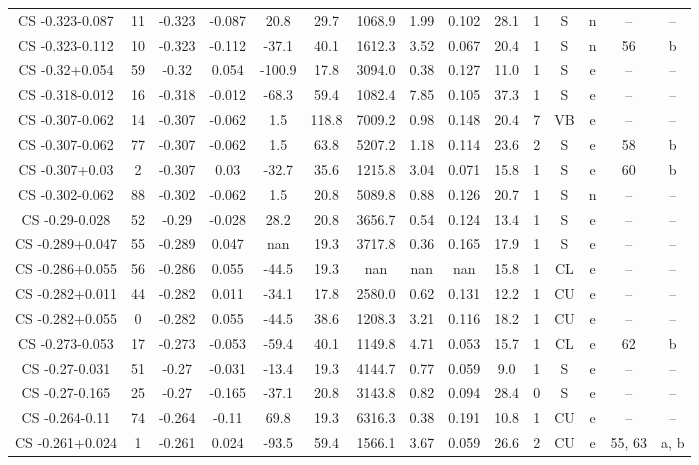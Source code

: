 \begin{table}
\begin{tabular}{ccccccccccccccc}
CS -0.323-0.087 & 11 & -0.323 & -0.087 & 20.8 & 29.7 & 1068.9 & 1.99 & 0.102 & 28.1 & 1 & S & n & -- & -- \\
CS -0.323-0.112 & 10 & -0.323 & -0.112 & -37.1 & 40.1 & 1612.3 & 3.52 & 0.067 & 20.4 & 1 & S & n & 56 & b \\
CS -0.32+0.054 & 59 & -0.32 & 0.054 & -100.9 & 17.8 & 3094.0 & 0.38 & 0.127 & 11.0 & 1 & S & e & -- & -- \\
CS -0.318-0.012 & 16 & -0.318 & -0.012 & -68.3 & 59.4 & 1082.4 & 7.85 & 0.105 & 37.3 & 1 & S & e & -- & -- \\
CS -0.307-0.062 & 14 & -0.307 & -0.062 & 1.5 & 118.8 & 7009.2 & 0.98 & 0.148 & 20.4 & 7 & VB & e & -- & -- \\
CS -0.307-0.062 & 77 & -0.307 & -0.062 & 1.5 & 63.8 & 5207.2 & 1.18 & 0.114 & 23.6 & 2 & S & e & 58 & b \\
CS -0.307+0.03 & 2 & -0.307 & 0.03 & -32.7 & 35.6 & 1215.8 & 3.04 & 0.071 & 15.8 & 1 & S & e & 60 & b \\
CS -0.302-0.062 & 88 & -0.302 & -0.062 & 1.5 & 20.8 & 5089.8 & 0.88 & 0.126 & 20.7 & 1 & S & n & -- & -- \\
CS -0.29-0.028 & 52 & -0.29 & -0.028 & 28.2 & 20.8 & 3656.7 & 0.54 & 0.124 & 13.4 & 1 & S & e & -- & -- \\
CS -0.289+0.047 & 55 & -0.289 & 0.047 & nan & 19.3 & 3717.8 & 0.36 & 0.165 & 17.9 & 1 & S & e & -- & -- \\
CS -0.286+0.055 & 56 & -0.286 & 0.055 & -44.5 & 19.3 & nan & nan & nan & 15.8 & 1 & CL & e & -- & -- \\
CS -0.282+0.011 & 44 & -0.282 & 0.011 & -34.1 & 17.8 & 2580.0 & 0.62 & 0.131 & 12.2 & 1 & CU & e & -- & -- \\
CS -0.282+0.055 & 0 & -0.282 & 0.055 & -44.5 & 38.6 & 1208.3 & 3.21 & 0.116 & 18.2 & 1 & CU & e & -- & -- \\
CS -0.273-0.053 & 17 & -0.273 & -0.053 & -59.4 & 40.1 & 1149.8 & 4.71 & 0.053 & 15.7 & 1 & CL & e & 62 & b \\
CS -0.27-0.031 & 51 & -0.27 & -0.031 & -13.4 & 19.3 & 4144.7 & 0.77 & 0.059 & 9.0 & 1 & S & e & -- & -- \\
CS -0.27-0.165 & 25 & -0.27 & -0.165 & -37.1 & 20.8 & 3143.8 & 0.82 & 0.094 & 28.4 & 0 & S & e & -- & -- \\
CS -0.264-0.11 & 74 & -0.264 & -0.11 & 69.8 & 19.3 & 6316.3 & 0.38 & 0.191 & 10.8 & 1 & CU & e & -- & -- \\
CS -0.261+0.024 & 1 & -0.261 & 0.024 & -93.5 & 59.4 & 1566.1 & 3.67 & 0.059 & 26.6 & 2 & CU & e & 55, 63 & a, b \\

\end{tabular}
\end{table}
